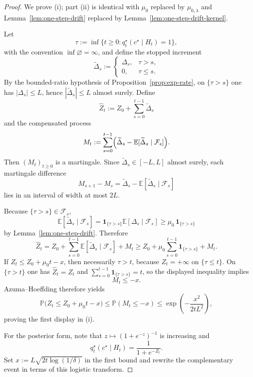 \documentclass[11pt]{article}
\theoremstyle{definition}
\theoremstyle{remark}
\newcommand{\E}{\mathbb{E}}
\newcommand{\Prob}{\mathbb{P}}
\newcommand{\one}{\mathbf{1}}
\begin{document}
\begin{proof}
We prove \textup{(i)}; part \textup{(ii)} is identical with $\mu_0$ replaced by $\mu_{0,\lambda}$ and Lemma~\ref{lem:one-step-drift} replaced by Lemma~\ref{lem:one-step-drift-kernel}.

Let
\[
\tau:=\inf\{t\ge 0:q_t^\star(c^\star\mid H_t)=1\},
\]
with the convention $\inf\varnothing=\infty$, and define the stopped increment
\[
\widetilde\Delta_s:=
\begin{cases}
\Delta_s, & \tau>s,\\
0, & \tau\le s.
\end{cases}
\]
By the bounded-ratio hypothesis of Proposition~\ref{prop:exp-rate}, on $\{\tau>s\}$ one has $|\Delta_s|\le L$, hence $|\widetilde\Delta_s|\le L$ almost surely. Define
\[
\widehat Z_t:=Z_0+\sum_{s=0}^{t-1}\widetilde\Delta_s
\]
and the compensated process
\[
M_t:=\sum_{s=0}^{t-1}\Bigl(\widetilde\Delta_s-\E[\widetilde\Delta_s\mid\mathcal F_s]\Bigr).
\]
Then $(M_t)_{t\ge 0}$ is a martingale. Since $\widetilde\Delta_s\in[-L,L]$ almost surely, each martingale difference
\[
M_{s+1}-M_s=\widetilde\Delta_s-\E[\widetilde\Delta_s\mid\mathcal F_s]
\]
lies in an interval of width at most $2L$.

Because $\{\tau>s\}\in\mathcal F_s$,
\[
\E[\widetilde\Delta_s\mid\mathcal F_s]
=
\one_{\{\tau>s\}}\E[\Delta_s\mid\mathcal F_s]
\ge
\mu_0\,\one_{\{\tau>s\}}
\]
by Lemma~\ref{lem:one-step-drift}. Therefore
\[
\widehat Z_t
=
Z_0+\sum_{s=0}^{t-1}\E[\widetilde\Delta_s\mid\mathcal F_s]+M_t
\ge
Z_0+\mu_0\sum_{s=0}^{t-1}\one_{\{\tau>s\}}+M_t.
\]
If $Z_t\le Z_0+\mu_0 t-x$, then necessarily $\tau>t$, because $Z_t=+\infty$ on $\{\tau\le t\}$. On $\{\tau>t\}$ one has $\widehat Z_t=Z_t$ and $\sum_{s=0}^{t-1}\one_{\{\tau>s\}}=t$, so the displayed inequality implies
\[
M_t\le -x.
\]
Azuma--Hoeffding therefore yields
\[
\Prob\!\bigl(Z_t\le Z_0+\mu_0 t-x\bigr)
\le
\Prob(M_t\le -x)
\le
\exp\!\left(-\frac{x^2}{2tL^2}\right),
\]
proving the first display in \textup{(i)}.

For the posterior form, note that $z\mapsto (1+e^{-z})^{-1}$ is increasing and
\[
q_t^\star(c^\star\mid H_t)=\frac{1}{1+e^{-Z_t}}.
\]
Set $x:=L\sqrt{2t\log(1/\delta)}$ in the first bound and rewrite the complementary event in terms of this logistic transform.
\end{proof}
\end{document}
